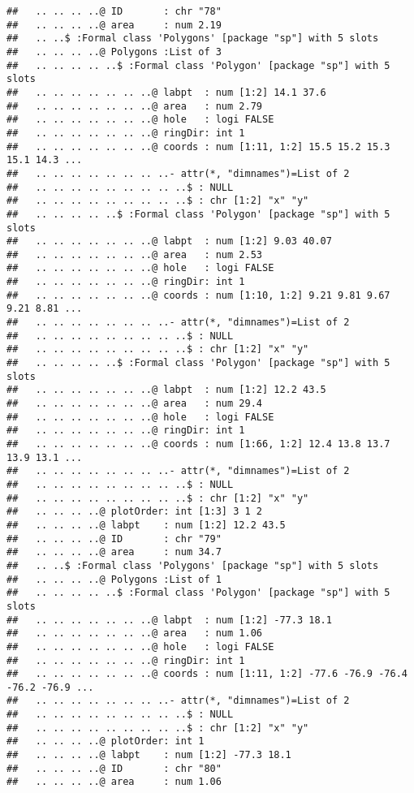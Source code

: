 \documentclass[]{article}
\begin{document}
\begin{verbatim}
##   .. .. .. ..@ ID       : chr "78"
##   .. .. .. ..@ area     : num 2.19
##   .. ..$ :Formal class 'Polygons' [package "sp"] with 5 slots
##   .. .. .. ..@ Polygons :List of 3
##   .. .. .. .. ..$ :Formal class 'Polygon' [package "sp"] with 5 slots
##   .. .. .. .. .. .. ..@ labpt  : num [1:2] 14.1 37.6
##   .. .. .. .. .. .. ..@ area   : num 2.79
##   .. .. .. .. .. .. ..@ hole   : logi FALSE
##   .. .. .. .. .. .. ..@ ringDir: int 1
##   .. .. .. .. .. .. ..@ coords : num [1:11, 1:2] 15.5 15.2 15.3 15.1 14.3 ...
##   .. .. .. .. .. .. .. ..- attr(*, "dimnames")=List of 2
##   .. .. .. .. .. .. .. .. ..$ : NULL
##   .. .. .. .. .. .. .. .. ..$ : chr [1:2] "x" "y"
##   .. .. .. .. ..$ :Formal class 'Polygon' [package "sp"] with 5 slots
##   .. .. .. .. .. .. ..@ labpt  : num [1:2] 9.03 40.07
##   .. .. .. .. .. .. ..@ area   : num 2.53
##   .. .. .. .. .. .. ..@ hole   : logi FALSE
##   .. .. .. .. .. .. ..@ ringDir: int 1
##   .. .. .. .. .. .. ..@ coords : num [1:10, 1:2] 9.21 9.81 9.67 9.21 8.81 ...
##   .. .. .. .. .. .. .. ..- attr(*, "dimnames")=List of 2
##   .. .. .. .. .. .. .. .. ..$ : NULL
##   .. .. .. .. .. .. .. .. ..$ : chr [1:2] "x" "y"
##   .. .. .. .. ..$ :Formal class 'Polygon' [package "sp"] with 5 slots
##   .. .. .. .. .. .. ..@ labpt  : num [1:2] 12.2 43.5
##   .. .. .. .. .. .. ..@ area   : num 29.4
##   .. .. .. .. .. .. ..@ hole   : logi FALSE
##   .. .. .. .. .. .. ..@ ringDir: int 1
##   .. .. .. .. .. .. ..@ coords : num [1:66, 1:2] 12.4 13.8 13.7 13.9 13.1 ...
##   .. .. .. .. .. .. .. ..- attr(*, "dimnames")=List of 2
##   .. .. .. .. .. .. .. .. ..$ : NULL
##   .. .. .. .. .. .. .. .. ..$ : chr [1:2] "x" "y"
##   .. .. .. ..@ plotOrder: int [1:3] 3 1 2
##   .. .. .. ..@ labpt    : num [1:2] 12.2 43.5
##   .. .. .. ..@ ID       : chr "79"
##   .. .. .. ..@ area     : num 34.7
##   .. ..$ :Formal class 'Polygons' [package "sp"] with 5 slots
##   .. .. .. ..@ Polygons :List of 1
##   .. .. .. .. ..$ :Formal class 'Polygon' [package "sp"] with 5 slots
##   .. .. .. .. .. .. ..@ labpt  : num [1:2] -77.3 18.1
##   .. .. .. .. .. .. ..@ area   : num 1.06
##   .. .. .. .. .. .. ..@ hole   : logi FALSE
##   .. .. .. .. .. .. ..@ ringDir: int 1
##   .. .. .. .. .. .. ..@ coords : num [1:11, 1:2] -77.6 -76.9 -76.4 -76.2 -76.9 ...
##   .. .. .. .. .. .. .. ..- attr(*, "dimnames")=List of 2
##   .. .. .. .. .. .. .. .. ..$ : NULL
##   .. .. .. .. .. .. .. .. ..$ : chr [1:2] "x" "y"
##   .. .. .. ..@ plotOrder: int 1
##   .. .. .. ..@ labpt    : num [1:2] -77.3 18.1
##   .. .. .. ..@ ID       : chr "80"
##   .. .. .. ..@ area     : num 1.06

\end{verbatim}
\end{document}
